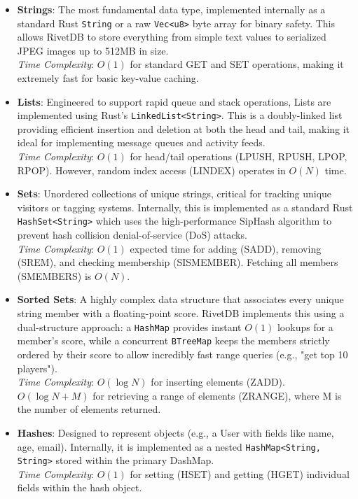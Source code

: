 \begin{itemize}[leftmargin=2.5em]
    \item \textbf{Strings}: The most fundamental data type, implemented internally as a standard Rust \texttt{String} or a raw \texttt{Vec<u8>} byte array for binary safety. This allows RivetDB to store everything from simple text values to serialized JPEG images up to 512MB in size. \\
    \textit{Time Complexity}: $O(1)$ for standard GET and SET operations, making it extremely fast for basic key-value caching.
    
    \item \textbf{Lists}: Engineered to support rapid queue and stack operations, Lists are implemented using Rust's \texttt{LinkedList<String>}. This is a doubly-linked list providing efficient insertion and deletion at both the head and tail, making it ideal for implementing message queues and activity feeds. \\
    \textit{Time Complexity}: $O(1)$ for head/tail operations (LPUSH, RPUSH, LPOP, RPOP). However, random index access (LINDEX) operates in $O(N)$ time.
    
    \item \textbf{Sets}: Unordered collections of unique strings, critical for tracking unique visitors or tagging systems. Internally, this is implemented as a standard Rust \texttt{HashSet<String>} which uses the high-performance SipHash algorithm to prevent hash collision denial-of-service (DoS) attacks. \\
    \textit{Time Complexity}: $O(1)$ expected time for adding (SADD), removing (SREM), and checking membership (SISMEMBER). Fetching all members (SMEMBERS) is $O(N)$.
    
    \item \textbf{Sorted Sets}: A highly complex data structure that associates every unique string member with a floating-point score. RivetDB implements this using a dual-structure approach: a \texttt{HashMap} provides instant $O(1)$ lookups for a member's score, while a concurrent \texttt{BTreeMap} keeps the members strictly ordered by their score to allow incredibly fast range queries (e.g., "get top 10 players"). \\
    \textit{Time Complexity}: $O(\log N)$ for inserting elements (ZADD). $O(\log N + M)$ for retrieving a range of elements (ZRANGE), where M is the number of elements returned.
    
    \item \textbf{Hashes}: Designed to represent objects (e.g., a User with fields like name, age, email). Internally, it is implemented as a nested \texttt{HashMap<String, String>} stored within the primary DashMap. \\
    \textit{Time Complexity}: $O(1)$ for setting (HSET) and getting (HGET) individual fields within the hash object.
    

\end{itemize}
